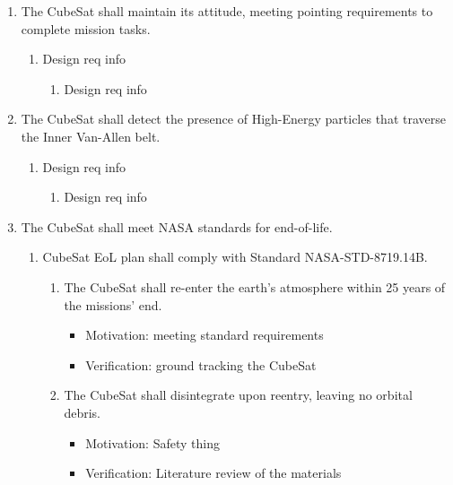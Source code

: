 \documentclass{ece}
\begin{document}
\begin{enumerate}
\begin{enumerate}
        \item Design req info
        \begin{enumerate}
            \item Design req info
        \end{enumerate}
    \end{enumerate}
    \item The CubeSat shall maintain its attitude, meeting pointing requirements to complete mission tasks.
    \begin{enumerate}
        \item Design req info
        \begin{enumerate}
            \item Design req info
        \end{enumerate}
    \end{enumerate}
    \item The CubeSat shall detect the presence of High-Energy particles that traverse the Inner Van-Allen belt.
    \begin{enumerate}
        \item Design req info
        \begin{enumerate}
            \item Design req info
        \end{enumerate}
    \end{enumerate} %
    \item The CubeSat shall meet NASA standards for end-of-life.
    \begin{enumerate}
        \item CubeSat EoL plan shall comply with Standard NASA-STD-8719.14B. 
        \begin{enumerate}
            \item The CubeSat shall re-enter the earth’s atmosphere within 25 years of the missions’ end. 
           \begin{itemize}
                \item Motivation: meeting standard requirements
                \item Verification: ground tracking the CubeSat
            \end{itemize}
            \item The CubeSat shall disintegrate upon reentry, leaving no orbital debris. 
            \begin{itemize}
                \item Motivation: Safety thing
                \item Verification: Literature review of the materials

\end{itemize}
\end{enumerate}
\end{enumerate}
\end{enumerate}
\end{document}
